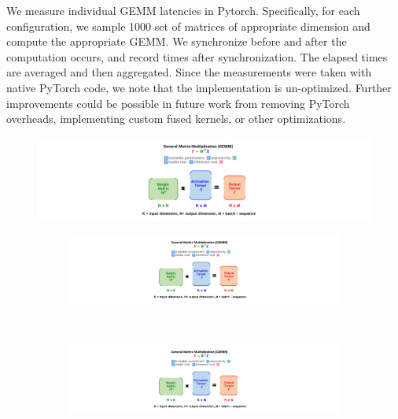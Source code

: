 \documentclass{article}
\theoremstyle{plain}
\begin{document}
We measure individual GEMM latencies in Pytorch. Specifically, for each configuration, we sample 1000 set of matrices of appropriate dimension and compute the appropriate GEMM. We synchronize before and after the computation occurs, and record times after synchronization. The elapsed times are averaged and then aggregated. Since the measurements were taken with native PyTorch code, we note that the implementation is un-optimized.  Further improvements could be possible in future work from removing PyTorch overheads, implementing custom fused kernels, or other optimizations.
\label{app:sensitivities}
\begin{figure}[!t]
\begin{center}
    \includegraphics[trim=0cm 17cm 19cm 0cm, clip, width = 0.95\linewidth,page=6]{espace_paper_figures.pdf}
    \begin{subfigure}[t]{0.7\textwidth}
    \centering     
    \includegraphics[trim=21.5cm 0.5cm 22cm 0.5cm, clip, width = 0.95\linewidth,page=11]{espace_paper_figures.pdf}
    \caption{}    
    \end{subfigure}\\
    \begin{subfigure}[t]{0.7\textwidth}
    \centering     
    \includegraphics[trim=21.5cm 0.5cm 22cm 0.5cm, clip, width = 0.95\linewidth,page=12]{espace_paper_figures.pdf}
    \caption{}    
    \end{subfigure}\\
    \begin{subfigure}[t]{0.7\textwidth}

\end{subfigure}
\end{center}
\end{figure}
\end{document}
